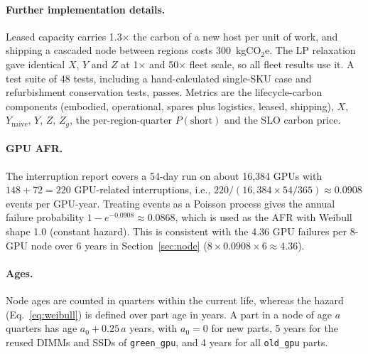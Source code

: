 \documentclass{article} %
\begin{document}
\paragraph{Further implementation details.} Leased capacity carries 1.3$\times$ the carbon of a new host per unit of work, and shipping a cascaded node between regions costs 300~kgCO$_2$e. The LP relaxation gave identical $X$, $Y$ and $Z$ at 1$\times$ and 50$\times$ fleet scale, so all fleet results use it. A test suite of 48 tests, including a hand-calculated single-SKU case and refurbishment conservation tests, passes. Metrics are the lifecycle-carbon components (embodied, operational, spares plus logistics, leased, shipping), $X$, $Y_{\text{naive}}$, $Y$, $Z$, $Z_g$, the per-region-quarter $P(\text{short})$ and the SLO carbon price.

\paragraph{GPU AFR.} The interruption report covers a 54-day run on about 16,384 GPUs with $148 + 72 = 220$ GPU-related interruptions, i.e., $220 / (16{,}384 \times 54/365) \approx 0.0908$ events per GPU-year. Treating events as a Poisson process gives the annual failure probability $1 - e^{-0.0908} \approx 0.0868$, which is used as the AFR with Weibull shape 1.0 (constant hazard). This is consistent with the 4.36 GPU failures per 8-GPU node over 6 years in Section~\ref{sec:node} ($8 \times 0.0908 \times 6 \approx 4.36$).

\paragraph{Ages.} Node ages are counted in quarters within the current life, whereas the hazard (Eq.~\ref{eq:weibull}) is defined over part age in years. A part in a node of age $a$ quarters has age $a_0 + 0.25\,a$ years, with $a_0 = 0$ for new parts, 5 years for the reused DIMMs and SSDs of \texttt{green\_gpu}, and 4 years for all \texttt{old\_gpu} parts.
\end{document}
